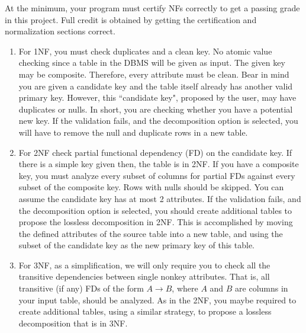 At the minimum, your program must certify NFs correctly to get a passing grade in this project. Full
credit is obtained by getting the certification and normalization sections correct.

\begin{enumerate}
	\item For 1NF, you must check duplicates and a clean key. No atomic value checking since a table in the
DBMS will be given as input. The given key may be composite. Therefore, every attribute must
be clean. Bear in mind you are given a candidate key and the table itself already has another valid
primary key. However, this ``candidate key", proposed by the user, may have duplicates or nulls. In
short, you are checking whether you have a potential new key.
If the validation fails, and the decomposition option is selected,
you will have to remove the null and duplicate rows in a new table.
	\item For 2NF check partial functional dependency (FD) on the candidate key. If there is a simple key given then, the table is in
2NF. If you have a composite key, you must analyze every subset of columns for partial FDs against
every subset of the composite key.
Rows with nulls should be skipped. You can assume the candidate key has at most 2 attributes.
If the validation fails, and the decomposition option is selected, 
you should create additional tables to propose the lossless decomposition in 2NF. This is
accomplished by moving
the defined attributes of the source table into a new table, and using the subset of the candidate key
as the new primary key of this table.
	\item For 3NF, as a simplification, we will only require you to check all the transitive dependencies between single nonkey attributes. That is, all transitive (if any) FDs
of the form $A \rightarrow B$, where $A$ and $B$ are columns in your input table,
should be analyzed. %
As in the 2NF, you maybe required to create additional tables, using a similar strategy, to propose a lossless decomposition that is 
in 3NF.
\end{enumerate}


